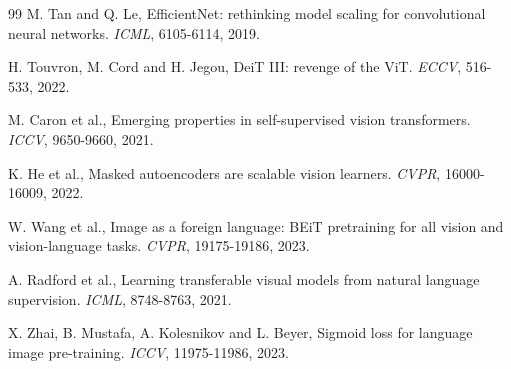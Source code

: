 \documentclass{esannV2}
\begin{document}
\begin{footnotesize}
\begin{thebibliography}{99}
 M. Tan and Q. Le, EfficientNet: rethinking model scaling for convolutional neural networks. \emph{ICML}, 6105-6114, 2019.

 H. Touvron, M. Cord and H. Jegou, DeiT III: revenge of the ViT. \emph{ECCV}, 516-533, 2022.

 M. Caron et al., Emerging properties in self-supervised vision transformers. \emph{ICCV}, 9650-9660, 2021.

 K. He et al., Masked autoencoders are scalable vision learners. \emph{CVPR}, 16000-16009, 2022.

 W. Wang et al., Image as a foreign language: BEiT pretraining for all vision and vision-language tasks. \emph{CVPR}, 19175-19186, 2023.

 A. Radford et al., Learning transferable visual models from natural language supervision. \emph{ICML}, 8748-8763, 2021.

 X. Zhai, B. Mustafa, A. Kolesnikov and L. Beyer, Sigmoid loss for language image pre-training. \emph{ICCV}, 11975-11986, 2023.

\end{thebibliography}
\end{footnotesize}
\end{document}
